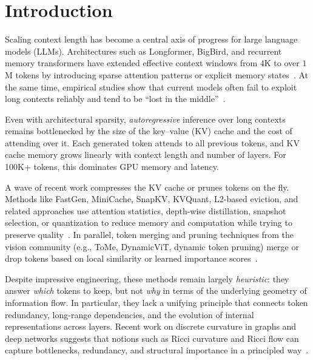 \documentclass{article}
\theoremstyle{plain}
\theoremstyle{definition}
\theoremstyle{remark}
\begin{document}
\section{Introduction}

Scaling context length has become a central axis of progress for large language models (LLMs). Architectures such as Longformer, BigBird, and recurrent memory transformers have extended effective context windows from $4$K to over $1$M tokens by introducing sparse attention patterns or explicit memory states~\citep{beltagy2020longformer,zaheer2020bigbird,bulatov2023rmt}. At the same time, empirical studies show that current models often fail to exploit long contexts reliably and tend to be ``lost in the middle''~\citep{liu2024lost}.

Even with architectural sparsity, \emph{autoregressive} inference over long contexts remains bottlenecked by the size of the key--value (KV) cache and the cost of attending over it. Each generated token attends to all previous tokens, and KV cache memory grows linearly with context length and number of layers. For 100K+ tokens, this dominates GPU memory and latency.

A wave of recent work compresses the KV cache or prunes tokens on the fly. Methods like FastGen, MiniCache, SnapKV, KVQuant, L2-based eviction, and related approaches use attention statistics, depth-wise distillation, snapshot selection, or quantization to reduce memory and computation while trying to preserve quality~\citep{ge2024fastgen,liu2024minicache,li2024snapkv,hooper2024kvquant,devoto2024l2kv}. In parallel, token merging and pruning techniques from the vision community (e.g., ToMe, DynamicViT, dynamic token pruning) merge or drop tokens based on local similarity or learned importance scores~\citep{bolya2023tome,rao2021dynamicvit,tang2023dynamicpruning,dong2022heatvit,sah2024bavit}.

Despite impressive engineering, these methods remain largely \emph{heuristic}: they answer \emph{which} tokens to keep, but not \emph{why} in terms of the underlying geometry of information flow. In particular, they lack a unifying principle that connects token redundancy, long-range dependencies, and the evolution of internal representations across layers. Recent work on discrete curvature in graphs and deep networks suggests that notions such as Ricci curvature and Ricci flow can capture bottlenecks, redundancy, and structural importance in a principled way~\citep{ollivier2009ricci,forman2003bochner,ni2019community,sia2019ollivier,yadav2025roadmap,baptista2024deep}.
\end{document}
